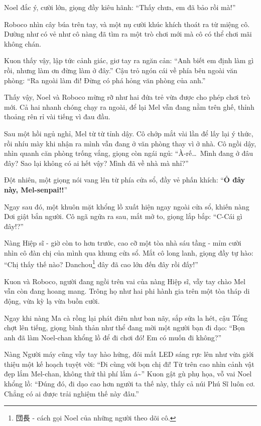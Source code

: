 \documentclass[../main.tex]{subfiles}
\begin{document}
Noel đắc ý, cười lớn, giọng đầy kiêu hãnh: ``Thấy chưa, em đã bảo rồi mà!''

Roboco nhìn cây búa trên tay, và một nụ cười khúc khích thoát ra từ miệng cô. Dường như có vẻ như cô nàng đã tìm ra một trò chơi mới mà cô có thể chơi mãi không chán.

Kuon thấy vậy, lập tức cảnh giác, giơ tay ra ngăn cản: ``Anh biết em định làm gì rồi, nhưng làm ơn đừng làm ở đây.'' Cậu trỏ ngón cái về phía bên ngoài văn phòng: ``Ra ngoài làm đi! Đừng có phá hỏng văn phòng của anh.''

Thấy vậy, Noel và Roboco mừng rỡ như hai đứa trẻ vừa được cho phép chơi trò mới. Cả hai nhanh chóng chạy ra ngoài, để lại Mel vẫn đang nằm trên ghế, thỉnh thoảng rên rỉ vài tiếng vì đau đầu.

\ct

Sau một hồi ngủ nghỉ, Mel từ từ tỉnh dậy. Cô chớp mắt vài lần để lấy lại ý thức, rồi nhíu mày khi nhận ra mình vẫn đang ở văn phòng thay vì ở nhà. Cô ngồi dậy, nhìn quanh căn phòng trống vắng, giọng còn ngái ngủ: ``À-rế\dots\ Mình đang ở đâu đây? Sao lại không có ai hết vậy? Mình đã về nhà mà nhỉ?''

Đột nhiên, một giọng nói vang lên từ phía cửa sổ, đầy vẻ phấn khích: ``\textbf{Ỏ đây này, Mel-senpai!!}''

Ngay sau đó, một khuôn mặt khổng lồ xuất hiện ngay ngoài cửa sổ, khiến nàng Dơi giật bắn người. Cô ngã ngửa ra sau, mắt mở to, giọng lắp bắp: ``C-Cái gì đây!?''

Nàng Hiệp sĩ - giờ còn to hơn trước, cao cỡ một tòa nhà sáu tầng - mỉm cười nhìn cô đàn chị của mình qua khung cửa sổ. Mắt cô long lanh, giọng đầy tự hào: ``Chị thấy thế nào? Danchou\footnote{団長 - cách gọi Noel của những người theo dõi cô.} đây đã cao lớn đến đây rồi đấy!''

Kuon và Roboco, người đang ngồi trên vai của nàng Hiệp sĩ, vẫy tay chào Mel vẫn còn đang hoang mang. Trông họ như hai phi hành gia trên một tòa tháp di động, vừa kỳ lạ vừa buồn cười.

Ngay khi nàng Ma cà rồng lại phát điên như ban nãy, sắp sửa la hét, cậu Tổng chợt lên tiếng, giọng bình thản như thể đang mời một người bạn đi dạo: ``Bọn anh đã làm Noel-chan khổng lồ để đi chơi đó! Em có muốn đi không?''

Nàng Người máy cũng vẫy tay hào hứng, đôi mắt LED sáng rực lên như vừa giới thiệu một kế hoạch tuyệt vời: ``Đi cùng với bọn chị đi! Từ trên cao nhìn cảnh vật đẹp lắm Mel-chan, không thử thì phí lắm á\~{}'' Kuon gật gù phụ họa, vỗ vai Noel khổng lồ: ``Đúng đó, đi dạo cao hơn người ta thế này, thấy cả núi Phú Sĩ luôn cơ. Chẳng có ai được trải nghiệm thế này đâu.''
\end{document}
